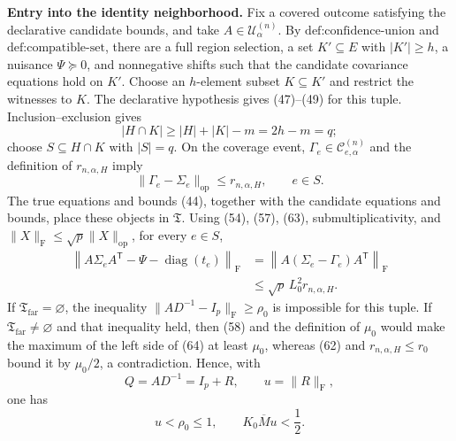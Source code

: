 \textbf{Entry into the identity neighborhood.}
Fix a covered outcome satisfying the declarative candidate bounds, and take \(A\in\mathcal U^{(n)}_\alpha\). By \(\text{def:confidence-union}\) and \(\text{def:compatible-set}\), there are a full region selection, a set \(K'\subseteq E\) with \(|K'|\geq h\), a nuisance \(\Psi\succeq0\), and nonnegative shifts such that the candidate covariance equations hold on \(K'\). Choose an \(h\)-element subset \(K\subseteq K'\) and restrict the witnesses to \(K\). The declarative hypothesis gives (47)--(49) for this tuple. Inclusion--exclusion gives
\[
|H\cap K|\geq|H|+|K|-m=2h-m=q;
\]
choose \(S\subseteq H\cap K\) with \(|S|=q\). On the coverage event, \(\Gamma_e\in\mathcal C^{(n)}_{e,\alpha}\) and the definition of \(r_{n,\alpha,H}\) imply
\[
\|\Gamma_e-\Sigma_e\|_{\mathrm{op}}
\leq r_{n,\alpha,H},
\qquad e\in S.
\tag{63}
\]
The true equations and bounds (44), together with the candidate equations and bounds, place these objects in \(\mathfrak T\). Using (54), (57), (63), submultiplicativity, and \(\|X\|_{\mathrm F}\leq\sqrt p\|X\|_{\mathrm{op}}\), for every \(e\in S\),
\[
\begin{aligned}
\left\|A\Sigma_eA^{\mathsf T}-\Psi-\operatorname{diag}(t_e)\right\|_{\mathrm F}
&=\left\|A(\Sigma_e-\Gamma_e)A^{\mathsf T}\right\|_{\mathrm F}\\
&\leq\sqrt p\,L_0^2r_{n,\alpha,H}.
\end{aligned}
\tag{64}
\]
If \(\mathfrak T_{\mathrm{far}}=\varnothing\), the inequality \(\|AD^{-1}-I_p\|_{\mathrm F}\geq\rho_0\) is impossible for this tuple. If \(\mathfrak T_{\mathrm{far}}\neq\varnothing\) and that inequality held, then (58) and the definition of \(\mu_0\) would make the maximum of the left side of (64) at least \(\mu_0\), whereas (62) and \(r_{n,\alpha,H}\leq r_0\) bound it by \(\mu_0/2\), a contradiction. Hence, with
\[
Q=AD^{-1}=I_p+R,
\qquad u=\|R\|_{\mathrm F},
\]
one has
\[
u<\rho_0\leq1,
\qquad K_0\overline M u<\frac12.
\tag{65}
\]

